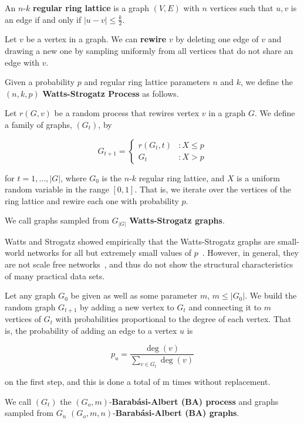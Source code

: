\begin{definition}
  An $n$-$k$ \textbf{regular ring lattice} is a graph $(V, E)$ with $n$ vertices
  such that $u,v$ is an edge if and only if $|u-v| \leq \frac{k}{2}$.
\end{definition}

\begin{definition}
  Let $v$ be a vertex in a graph. We can \textbf{rewire} $v$ by deleting one
  edge of $v$ and drawing a new one by sampling uniformly from all vertices that
  do not share an edge with $v$.
\end{definition}

\begin{definition}
  Given a probability $p$ and regular ring lattice parameters $n$ and $k$, we
  define the $(n,k,p)$ \textbf{Watts-Strogatz Process} as follows.

  Let $r(G,v)$ be a random process that rewires vertex $v$ in a graph $G$. We
  define a family of graphs, $(G_t)$, by

  \[
    G_{t+1} = \left\{
      \begin{array}{lc}
        r(G_t,t) &: X \leq p \\
        G_t &: X > p
      \end{array}
    \right.
  \]

  for $t = 1,\dots, |G|$, where $G_0$ is the $n$-$k$ regular ring lattice, and
  $X$ is a uniform random variable in the range $[0,1]$. That is, we iterate
  over the vertices of the ring lattice and rewire each one with probability
  $p$.

  We call graphs sampled from $G_{|G|}$ \textbf{Watts-Strogatz graphs}.
\end{definition}

Watts and Strogatz showed empirically that the Watts-Strogatz graphs are small-world networks for all
but extremely small values of $p$~\cite{Watts1998Collective}. However, in general, they are not scale
free networks~\cite{Barabasi509}, and thus do not show the structural characteristics of many
practical data sets.

\begin{definition}
  \label{def:ba}
  Let any graph $G_0$ be given as well as some parameter $m$, $m \leq |G_0|$. We
  build the random graph $G_{t+1}$ by adding a new vertex to $G_t$ and
  connecting it to $m$ vertices of $G_t$ with probabilities proportional to the
  degree of each vertex. That is, the probability of adding an edge to a vertex
  $u$ is

  \[
    p_u = \frac{\deg(v)}{\sum_{v \in G_t} \deg(v)}
  \]

  on the first step, and this is done a total of m times without replacement.

  We call $(G_t)$ the $(G_o,m)$-\textbf{Barab\'asi-Albert (BA) process} and graphs
  sampled from $G_n$ $(G_o,m,n)$-\textbf{Barab\'asi-Albert (BA) graphs}.
\end{definition}

